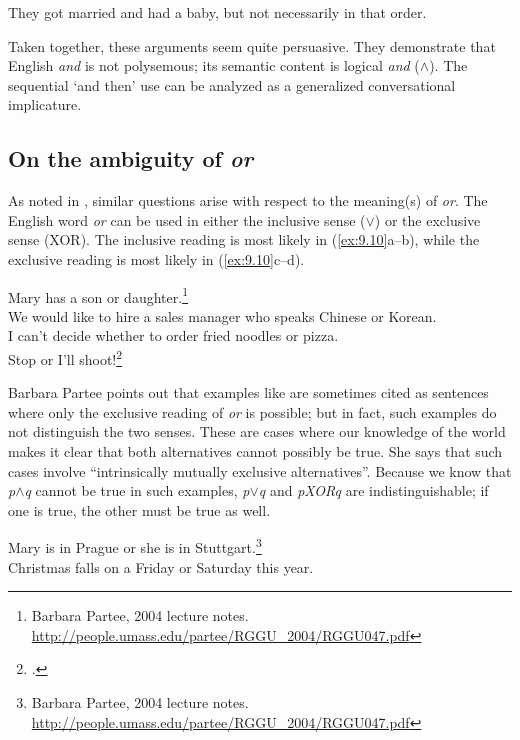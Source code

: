 \ea \label{ex:9.9}
They got married and had a baby, but not necessarily in that order.
\z


Taken together, these arguments seem quite persuasive. They demonstrate that English \textit{and} is not polysemous; its semantic content is logical \textit{and} ($\wedge$). The sequential ‘and then’ use can be analyzed as a generalized conversational implicature.


\subsection{On the ambiguity of \textit{or}}\label{sec:9.2.2}

As noted in , similar questions arise with respect to the meaning(s) of \textit{or}. The English word \textit{or} can be used in either the inclusive sense ($\vee$) or the exclusive sense (XOR). The inclusive reading is most likely in (\ref{ex:9.10}a--b), while the exclusive reading is most likely in (\ref{ex:9.10}c--d).


\ea \label{ex:9.10}
\ea Mary has a son or daughter.\footnote{Barbara Partee, 2004 lecture notes. \url{http://people.umass.edu/partee/RGGU_2004/RGGU047.pdf}} \\
\ex We would like to hire a sales manager who speaks  {Chinese} or  {Korean}.\\
\ex I can’t decide whether to order fried noodles or pizza.\\
\ex Stop or I’ll shoot!\footnote{\citet[113]{Saeed2009}.}
                       \z
\z


Barbara Partee points out that examples like  are sometimes cited as sentences where only the exclusive reading of \textit{or} is possible; but in fact, such examples do not distinguish the two senses. These are cases where our knowledge of the world makes it clear that both alternatives cannot possibly be true. She says that such cases involve “intrinsically mutually exclusive alternatives”. Because we know that \textit{p$\wedge$q} cannot be true in such examples, \textit{p$\vee$q} and \textit{pXORq} are indistinguishable; if one is true, the other must be true as well.


\ea \label{ex:9.11}
\ea Mary is in Prague or she is in Stuttgart.\footnote{Barbara Partee, 2004 lecture notes. \url{http://people.umass.edu/partee/RGGU_2004/RGGU047.pdf}} \\
\ex Christmas falls on a Friday or Saturday this year.
                       \z
\z



